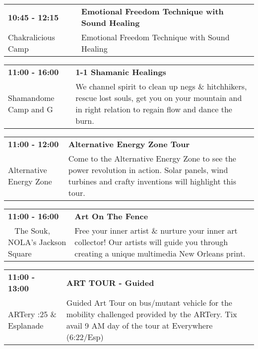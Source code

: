 \begin{tabular}{ p{1in} p{2.2in} }
    \textbf{10:45 - 12:15} & \textbf{Emotional Freedom Technique with Sound Healing} \\
    Chakralicious Camp \newline  & Emotional Freedom Technique with Sound Healing \\
    \hline 
\end{tabular}
    
\begin{tabular}{ p{1in} p{2.2in} }
    \textbf{11:00 - 16:00} & \textbf{1-1 Shamanic Healings} \\
    Shamandome Camp \newline 615 and G & We channel spirit to clean up negs \& hitchhikers, rescue lost souls, get you on your mountain and in right relation to regain flow and dance the burn. \\
    \hline 
\end{tabular}
    
\begin{tabular}{ p{1in} p{2.2in} }
    \textbf{11:00 - 12:00} & \textbf{Alternative Energy Zone Tour} \\
    Alternative Energy Zone \newline  & Come to the Alternative Energy Zone to see the power revolution in action. Solar panels, wind turbines and crafty inventions will highlight this tour. \\
    \hline 
\end{tabular}
    
\begin{tabular}{ p{1in} p{2.2in} }
    \textbf{11:00 - 16:00} & \textbf{Art On The Fence} \\
    ~ \newline The Souk, NOLA's Jackson Square  & Free your inner artist \& nurture your inner art collector! Our artists will guide you through creating a unique multimedia New Orleans print. \\
    \hline 
\end{tabular}
    
\begin{tabular}{ p{1in} p{2.2in} }
    \textbf{11:00 - 13:00} & \textbf{ART TOUR - Guided} \\
    ARTery \newline 6:25 \& Esplanade & Guided Art Tour on bus/mutant vehicle for the mobility challenged provided by the ARTery.  Tix avail 9 AM  day of the tour at Everywhere (6:22/Esp) \\
    \hline 
\end{tabular}
    
